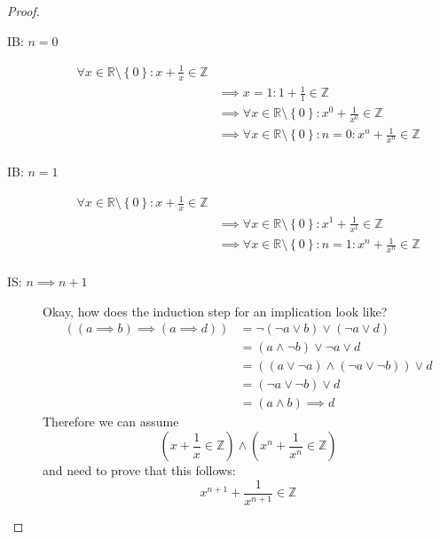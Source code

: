 \documentclass[a4paper]{article}
\theoremstyle{definition}
\newcommand\set[1]{\left\{#1\right\}}
\begin{document}
\begin{proof}
  \begin{description}
    \item[IB: $n = 0$]
      \begin{align*}
        \forall x \in \mathbb{R} \setminus \set{0}: x + \frac1x \in \mathbb{Z} & \\
        &\implies x = 1: 1 + \frac11 \in \mathbb Z \\
        &\implies \forall x \in \mathbb{R} \setminus \set{0}: x^0 + \frac1{x^0} \in \mathbb Z \\
        &\implies \forall x \in \mathbb{R} \setminus \set{0}: n = 0: x^n + \frac1{x^n} \in \mathbb Z \\
      \end{align*}
    \item[IB: $n = 1$]
      \begin{align*}
        \forall x \in \mathbb{R} \setminus \set{0}: x + \frac1x \in \mathbb{Z} & \\
        &\implies \forall x \in \mathbb{R} \setminus \set{0}: x^1 + \frac1{x^1} \in \mathbb Z \\
        &\implies \forall x \in \mathbb{R} \setminus \set{0}: n = 1: x^n + \frac1{x^n} \in \mathbb Z \\
      \end{align*}
    \item[IS: $n \implies n + 1$]
      Okay, how does the induction step for an implication look like?
      \begin{align*}
        \left((a \implies b) \implies (a \implies d)\right)
          &= \neg (\neg a \lor b) \lor (\neg a \lor d) \\
          &= (a \land \neg b) \lor \neg a \lor d \\
          &= ((a \lor \neg a) \land (\neg a \lor \neg b)) \lor d \\
          &= (\neg a \lor \neg b) \lor d \\
          &= (a \land b) \implies d
      \end{align*}
      Therefore we can assume
      \[ \left(x + \frac1x \in \mathbb Z\right) \land \left(x^n + \frac1{x^n} \in \mathbb Z\right) \]
      and need to prove that this follows:
      \[ x^{n+1} + \frac1{x^{n+1}} \in \mathbb Z \]


\end{description}
\end{proof}
\end{document}
